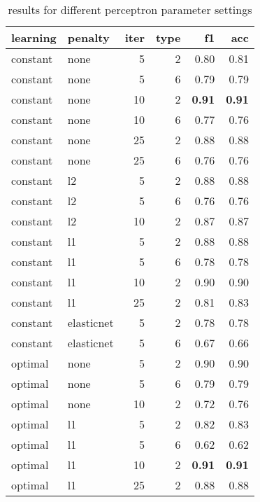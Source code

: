 \documentclass[11pt]{article}
\begin{document}
\begin{table}[ht]\footnotesize
  \caption{results for different perceptron parameter settings}
  \label{tab:param}
  \begin{tabular}{llrrrr}
    learning   & penalty    & iter & type & f1   & acc  \\
    \hline
    constant   & none       & 5    & 2    & 0.80 & 0.81 \\
    constant   & none       & 5    & 6    & 0.79 & 0.79 \\
    constant   & none       & 10   & 2    & \textbf{0.91} & \textbf{0.91} \\
    constant   & none       & 10   & 6    & 0.77 & 0.76 \\
    constant   & none       & 25   & 2    & 0.88 & 0.88 \\
    constant   & none       & 25   & 6    & 0.76 & 0.76 \\
    \cline{2-6}
    constant   & l2         & 5    & 2    & 0.88 & 0.88 \\
    constant   & l2         & 5    & 6    & 0.76 & 0.76 \\
    constant   & l2         & 10   & 2    & 0.87 & 0.87 \\
    \cline{2-6}
    constant   & l1         & 5    & 2    & 0.88 & 0.88 \\
    constant   & l1         & 5    & 6    & 0.78 & 0.78 \\
    constant   & l1         & 10   & 2    & 0.90 & 0.90 \\
    constant   & l1         & 25   & 2    & 0.81 & 0.83 \\
    \cline{2-6}
    constant   & elasticnet & 5    & 2    & 0.78 & 0.78 \\
    constant   & elasticnet & 5    & 6    & 0.67 & 0.66 \\
    \hline
    optimal    & none       & 5    & 2    & 0.90 & 0.90 \\
    optimal    & none       & 5    & 6    & 0.79 & 0.79 \\
    optimal    & none       & 10   & 2    & 0.72 & 0.76 \\
    \cline{2-6}
    optimal    & l1         & 5    & 2    & 0.82 & 0.83 \\
    optimal    & l1         & 5    & 6    & 0.62 & 0.62 \\
    optimal    & l1         & 10   & 2    & \textbf{0.91} & \textbf{0.91} \\
    optimal    & l1         & 25   & 2    & 0.88 & 0.88 \\

\end{tabular}
\end{table}
\end{document}
